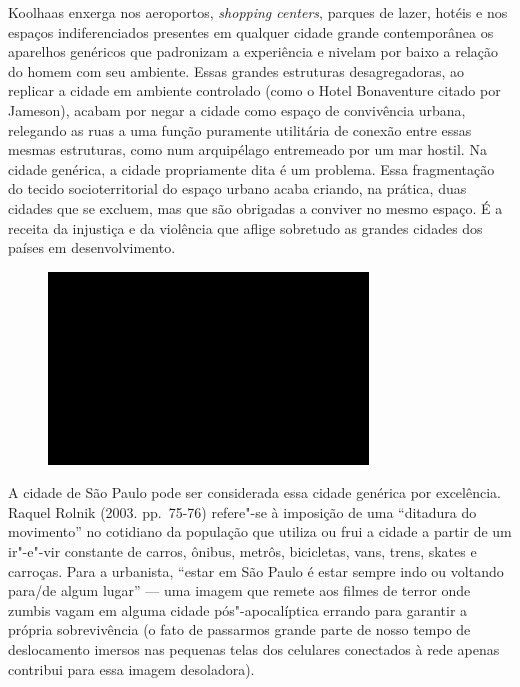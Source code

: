 Koolhaas enxerga nos aeroportos, \emph{shopping centers}, parques de lazer,
hotéis e nos espaços indiferenciados presentes em qualquer cidade grande
contemporânea os aparelhos genéricos que padronizam a experiência e
nivelam por baixo a relação do homem com seu ambiente. Essas grandes
estruturas desagregadoras, ao replicar a cidade em ambiente controlado
(como o Hotel Bonaventure citado por Jameson), acabam por negar a cidade
como espaço de convivência urbana, relegando as ruas a uma função
puramente utilitária de conexão entre essas mesmas estruturas, como num
arquipélago entremeado por um mar hostil. Na cidade genérica, a cidade
propriamente dita é um problema. Essa fragmentação do tecido
socioterritorial do espaço urbano acaba criando, na prática, duas
cidades que se excluem, mas que são obrigadas a conviver no mesmo
espaço. É a receita da injustiça e da violência que aflige sobretudo as
grandes cidades dos países em desenvolvimento.

\begin{figure}[!ht]

\centering
 \includegraphics[width=85mm]{./imgs/im1.jpg}
\caption{\tiny{}}

\end{figure}

A cidade de São Paulo pode ser considerada essa cidade genérica por
excelência. Raquel Rolnik (2003. pp.~75-76) refere"-se à imposição de uma
``ditadura do movimento'' no cotidiano da população que utiliza ou frui
a cidade a partir de um ir"-e"-vir constante de carros, ônibus, metrôs,
bicicletas, vans, trens, skates e carroças. Para a urbanista, ``estar em
São Paulo é estar sempre indo ou voltando para/de algum lugar'' --- uma
imagem que remete aos filmes de terror onde zumbis vagam em alguma
cidade pós"-apocalíptica errando para garantir a própria sobrevivência (o
fato de passarmos grande parte de nosso tempo de deslocamento imersos
nas pequenas telas dos celulares conectados à rede apenas contribui para
essa imagem desoladora).

